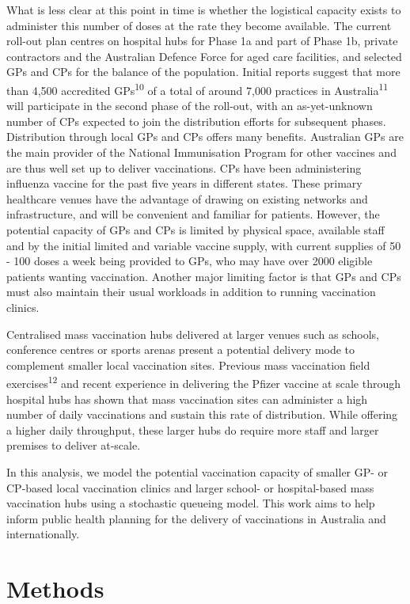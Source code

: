 \documentclass{article}
\begin{document}
What is less clear at this point in time is whether the logistical
capacity exists to administer this number of doses at the rate they
become available. The current roll-out plan centres on hospital hubs for
Phase 1a and part of Phase 1b, private contractors and the Australian
Defence Force for aged care facilities, and selected GPs and CPs for the
balance of the population. Initial reports suggest that more than 4,500
accredited GPs\textsuperscript{10} of a total of around 7,000 practices
in Australia\textsuperscript{11} will participate in the second phase of
the roll-out, with an as-yet-unknown number of CPs expected to join the
distribution efforts for subsequent phases. Distribution through local
GPs and CPs offers many benefits. Australian GPs are the main provider
of the National Immunisation Program for other vaccines and are thus
well set up to deliver vaccinations. CPs have been administering
influenza vaccine for the past five years in different states. These
primary healthcare venues have the advantage of drawing on existing
networks and infrastructure, and will be convenient and familiar for
patients. However, the potential capacity of GPs and CPs is limited by
physical space, available staff and by the initial limited and variable
vaccine supply, with current supplies of 50 - 100 doses a week being
provided to GPs, who may have over 2000 eligible patients wanting
vaccination. Another major limiting factor is that GPs and CPs must also
maintain their usual workloads in addition to running vaccination
clinics.

Centralised mass vaccination hubs delivered at larger venues such as
schools, conference centres or sports arenas present a potential
delivery mode to complement smaller local vaccination sites. Previous
mass vaccination field exercises\textsuperscript{12} and recent
experience in delivering the Pfizer vaccine at scale through hospital
hubs has shown that mass vaccination sites can administer a high number
of daily vaccinations and sustain this rate of distribution. While
offering a higher daily throughput, these larger hubs do require more
staff and larger premises to deliver at-scale.

In this analysis, we model the potential vaccination capacity of smaller
GP- or CP-based local vaccination clinics and larger school- or
hospital-based mass vaccination hubs using a stochastic queueing model.
This work aims to help inform public health planning for the delivery of
vaccinations in Australia and internationally.

\hypertarget{methods}{%
\section{Methods}\label{methods}}
\end{document}
